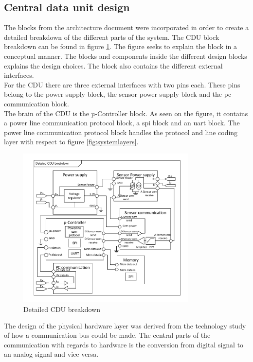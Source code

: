 \subsection{Central data unit design}
The blocks from the architecture document were incorporated in order to create a detailed breakdown of the different parts of the system. The CDU block breakdown can be found in figure \ref{fig:detailedCDU}. The figure seeks to explain the block in a conceptual manner. The blocks and components inside the different design blocks explains the design choices. The block also contains the different external interfaces. \\
For the CDU there are three external interfaces with two pins each. These pins belong to the power supply block, the sensor power supply block and the pc communication block.\\
The brain of the CDU is the µ-Controller block. As seen on the figure, it contains a power line communication protocol block, a spi block and an uart block. The power line communication protocol block handles the protocol and line coding layer with respect to figure \ref{fig:systemlayers}.
\begin{figure}[H]
	\centering
	\includegraphics[width=0.8\textwidth]{billeder/11ProjectDescription/detailedCDU}
	\caption{Detailed CDU breakdown}
	\label{fig:detailedCDU}
\end{figure}
The design of the physical hardware layer was derived from the technology study of how a communication bus could be made. The central parts of the communication with regards to hardware is the conversion from digital signal to an analog signal and vice versa.\\ 

